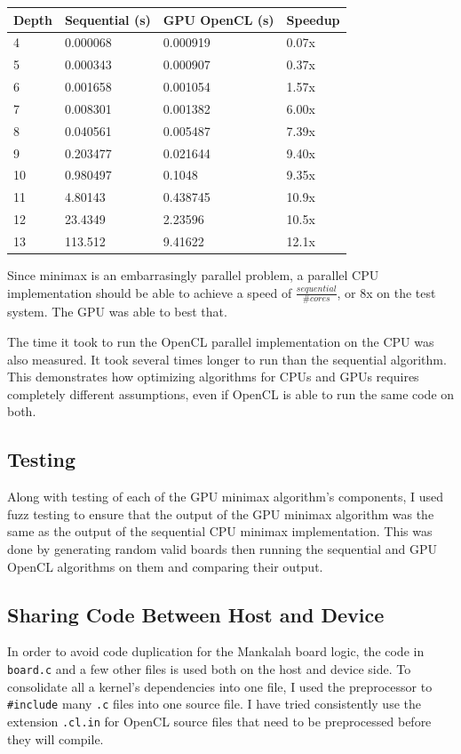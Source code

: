 \documentclass{article}
\begin{document}
\begin{tabular}{| l | l | l | l |}
  \hline
  Depth & Sequential (s) & GPU OpenCL (s) & Speedup\\
  \hline
  4 & 0.000068 & 0.000919 & 0.07x \\
  5 & 0.000343 & 0.000907 & 0.37x \\
  6 & 0.001658 & 0.001054 & 1.57x \\
  7 & 0.008301 & 0.001382 & 6.00x \\
  8 & 0.040561 & 0.005487 & 7.39x \\
  9 & 0.203477 & 0.021644 & 9.40x \\
  10 & 0.980497 & 0.1048 & 9.35x \\
  11 & 4.80143 & 0.438745 & 10.9x \\
  12 & 23.4349 & 2.23596 & 10.5x \\
  13 & 113.512 & 9.41622 & 12.1x \\
  \hline
\end{tabular}

Since minimax is an embarrasingly parallel problem, a parallel CPU implementation should be able to achieve a speed of $\frac{sequential}{\# cores}$, or 8x on the test system. The GPU was able to best that.

The time it took to run the OpenCL parallel implementation on the CPU was also measured. It took several times longer to run than the sequential algorithm. This demonstrates how optimizing algorithms for CPUs and GPUs requires completely different assumptions, even if OpenCL is able to run the same code on both.

\subsection{Testing}
Along with testing of each of the GPU minimax algorithm's components, I used fuzz testing to ensure that the output of the GPU minimax algorithm was the same as the output of the sequential CPU minimax implementation. This was done by generating random valid boards then running the sequential and GPU OpenCL algorithms on them and comparing their output.

\subsection{Sharing Code Between Host and Device}
In order to avoid code duplication for the Mankalah board logic, the code in \texttt{board.c} and a few other files is used both on the host and device side. To consolidate all a kernel's dependencies into one file, I used the preprocessor to \texttt{\#include} many \texttt{.c} files into one source file. I have tried consistently use the extension \texttt{.cl.in} for OpenCL source files that need to be preprocessed before they will compile.
\end{document}
